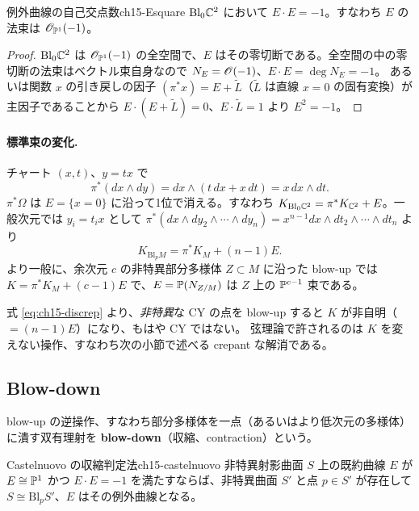 \begin{myprop}{例外曲線の自己交点数}{ch15-Esquare}
$\mathrm{Bl}_0\mathbb{C}^2$ において $E\cdot E = -1$。すなわち $E$ の法束は $\mathscr{O}_{\mathbb{P}^1}(-1)$。
\end{myprop}

\begin{proof}
$\mathrm{Bl}_0\mathbb{C}^2$ は $\mathscr{O}_{\mathbb{P}^1}(-1)$ の全空間で、$E$ はその零切断である。全空間の中の零切断の法束はベクトル束自身なので $N_E = \mathscr{O}(-1)$、$E\cdot E = \deg N_E = -1$。
あるいは関数 $x$ の引き戻しの因子 $(\pi^*x) = E + \tilde L$（$\tilde L$ は直線 $x=0$ の固有変換）が主因子であることから $E\cdot(E+\tilde L) = 0$、$E\cdot\tilde L = 1$ より $E^2 = -1$。
\end{proof}

\paragraph{標準束の変化.}
チャート $(x,t)$、$y = tx$ で
\[
\pi^*(dx\wedge dy) = dx\wedge(t\,dx + x\,dt) = x\,dx\wedge dt .
\]
$\pi^*\Omega$ は $E = \{x=0\}$ に沿って1位で消える。すなわち $K_{\mathrm{Bl}_0\mathbb{C}^2} = \pi^*K_{\mathbb{C}^2} + E$。一般次元では $y_i = t_ix$ として $\pi^*(dx\wedge dy_2\wedge\cdots\wedge dy_n) = x^{n-1}dx\wedge dt_2\wedge\cdots\wedge dt_n$ より
\begin{equation}\label{eq:ch15-discrep}
K_{\mathrm{Bl}_pM} = \pi^*K_M + (n-1)E .
\end{equation}
より一般に、余次元 $c$ の非特異部分多様体 $Z\subset M$ に沿った blow-up では $K = \pi^*K_M + (c-1)E$ で、$E = \mathbb{P}(N_{Z/M})$ は $Z$ 上の $\mathbb{P}^{c-1}$ 束である。

\begin{physbox}
式 \eqref{eq:ch15-discrep} より、\emph{非特異}な CY の点を blow-up すると $K$ が非自明（$= (n-1)E$）になり、もはや CY ではない。
弦理論で許されるのは $K$ を変えない操作、すなわち次の小節で述べる crepant な解消である。
\end{physbox}

\subsection{Blow-down}

blow-up の逆操作、すなわち部分多様体を一点（あるいはより低次元の多様体）に潰す双有理射を \textbf{blow-down}（収縮、contraction）という。

\begin{mythm}{Castelnuovo の収縮判定法}{ch15-castelnuovo}
非特異射影曲面 $S$ 上の既約曲線 $E$ が $E\cong\mathbb{P}^1$ かつ $E\cdot E = -1$ を満たすならば、非特異曲面 $S'$ と点 $p\in S'$ が存在して $S\cong\mathrm{Bl}_pS'$、$E$ はその例外曲線となる。
\end{mythm}

